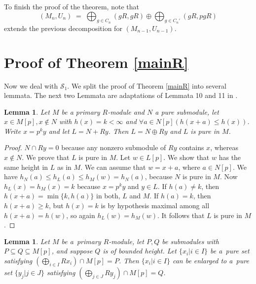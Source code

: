 \documentclass[twoside,leqno,12pt]{amsart}
\newtheorem{lem}[thm]{Lemma}
\theoremstyle{definition}
\theoremstyle{remark}
\numberwithin{equation}{section}
\begin{document}
  To finish the proof of the theorem, note that
  $$(M_n,U_n)\;=\;\bigoplus_{g\in C_n}(gR,gR)
  \oplus\bigoplus_{g\in C_n'}(gR, pgR)$$
  extends the previous decomposition for $(M_{n-1},U_{n-1})$.





  \section{Proof of Theorem \ref{mainR}} \label{sec-proof3}


  Now we deal with $\mathcal S_1$.
  We split the proof of Theorem \ref{mainR} into several lemmata. The next two Lemmata are adaptations of Lemmata 10 and 11 in \cite{kap}.

\begin{lem}
 Let $M$ be a primary $R$-module and $N$ a pure submodule, let $x\in M[p],x\notin N$ with $h(x)=k<\infty$ and $\forall a\in N[p] (h(x+a)\leq h(x))$. Write $x=p^k y$ and let $L=N+Ry$. Then $L=N\oplus Ry$ and $L$ is pure in $M$. \label{3.2}
\end{lem}

\begin{proof}
 $N\cap Ry=0$ because any nonzero submodule of $Ry$ contains $x$, whereas $x\notin N$. We prove that $L$ is pure in $M$. Let $w\in L[p]$. We show that $w$ has the same height in $L$ as in $M$. We can assume that $w= x+a$, where $a\in N[p]$. We have $h_N (a)\leq h_L (a)\leq h_M (w)=h_N (a)$, because $N$ is pure in $M$. Now $h_L (x)=h_M (x)=k$ because $x=p^k y$ and $y\in L$.  If $h(a)\neq k$, then $h(x+a)=\min\{k,h(a)\}$ in both, $L$ and $M$. If $h(a)=k$, then $h(x+a)\geq k$, but $h(x)=k$ is by hypothesis maximal among all $h(x+a)=h(w)$, so again $h_L (w)=h_M (w)$. It follows that $L$ is pure in $M$.
\end{proof}


\begin{lem}
Let $M$ be a~primary $R$-module, let $P,Q$ be submodules
with $P\subseteq Q\subseteq M[p]$, and suppose $Q$ is of bounded height. Let $\{x_i|i\in I\}$ be a~pure set satisfying $(\bigoplus_{i\in I} Rx_i) \cap M[p]=P$. Then $\{x_i|i\in I\}$ can be enlarged to a~pure set $\{y_j|j\in J\}$ satisfying $(\bigoplus_{j\in J} Ry_j)\cap M[p]=Q$. \label{lem-kap-pure}
\end{lem}
\end{document}
